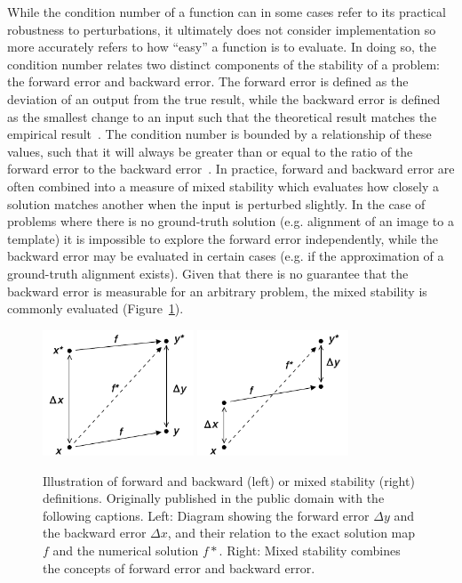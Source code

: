 While the condition number of a function can in some cases refer to its practical robustness to perturbations, it ultimately
does not consider implementation so more accurately refers to how ``easy'' a function is to evaluate. In doing so, the
condition number relates two distinct components of the stability of a problem: the forward error and backward error. The
forward error is defined as the deviation of an output from the true result, while the backward error is defined as the
smallest change to an input such that the theoretical result matches the empirical result~\cite{higham2002accuracy}. The
condition number is bounded by a relationship of these values, such that it will always be greater than or equal to the
ratio of the forward error to the backward error~\cite{belsley2005regression}. In practice, forward and backward error are
often combined into a measure of mixed stability which evaluates how closely a solution matches another when the input is
perturbed slightly. In the case of problems where there is no ground-truth solution (e.g. alignment of an image to a
template) it is impossible to explore the forward error independently, while the backward error may be evaluated in certain
cases (e.g. if the approximation of a ground-truth alignment exists). Given that there is no guarantee that the backward
error is measurable for an arbitrary problem, the mixed stability is commonly evaluated (Figure~\ref{fig:stability}).

\begin{figure}[b!]
\centering
\includegraphics[width=0.4\textwidth]{./figs/forward_stab.pdf}
\includegraphics[width=0.4\textwidth]{./figs/mixed_stab.pdf}
\caption[Illustration of forward, backward, and mixed stability]{Illustration of forward and backward (left) or mixed
stability (right) definitions. Originally published in the public domain with the following captions. Left: Diagram showing
the forward error $\Delta y$ and the backward error $\Delta x$, and their relation to the exact solution map $f$ and the
numerical solution $f*$. Right: Mixed stability combines the concepts of forward error and backward error.\cite{stability_wiki}}
\label{fig:stability}
\end{figure}

